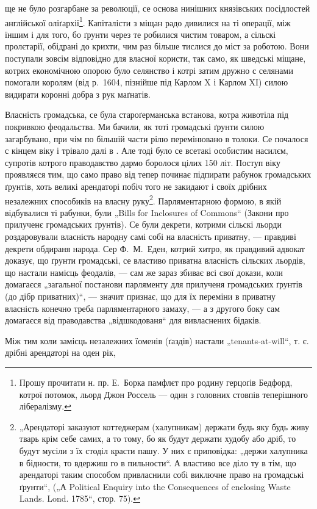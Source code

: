 \parcont{}
ще не було розгарбане за революції, се основа нинішних
князівських посідлостей англійської оліґархії\footnote{
Прошу прочитати н. пр. Е.~Борка памфлєт про родину герцоґів
Бедфорд, котрої потомок, льорд Джон Россель — один з головних стовпів
теперішного лібералізму.
}. Капіталісти
з міщан радо дивилися на ті операції, між їншим і для
того, бо ґрунти через те робилися чистим товаром, а сільскі
пролєтарії, обідрані до крихти, чим раз більше тислися
до міст за роботою. Вони поступали зовсім відповідно для
власної користи, так само, як шведські міщане, котрих економічною
опорою було селянство і котрі затим дружно с селянами
помогали королям (від р.~1604, пізнійше під Карлом
X і Карлом XI) силою видирати коронні добра з рук
маґнатів.

Власність громадська, се була староґерманська встанова,
котра животіла під покривкою феодальства. Ми бачили,
як тоті громадські ґрунти силою загарбувано, при
чім по більшій части рілю перемінювано в толоки. Се почалося
с кінцем  віку і трівало далі в . Але тоді було
се всетакі особистим насилєм, супротів котрого праводавство
дармо боролося цілих 150 літ. Поступ  віку проявляєся
тим, що само право від тепер починає підпирати рабунок
громадських ґрунтів, хоть великі арендаторі побіч
того не закидают і своїх дрібних незалежних способиків на
власну руку\footnote{
„Арендаторі заказуют коттеджерам (халупникам) держати будь
яку будь живу тварь крім себе самих, а то тому, бо як будут держати
худобу або дріб, то будут мусіли з їх стоділ красти пашу. У них є приповідка:
„держи халупника в бідности, то вдержиш го в пильности“.
А властиво все діло ту в тім, що арендаторі таким способом привласнили
собі виключне право на громадські ґрунти“, („А Political Enquiry into
the Consequences of enclosing Waste Lands. Lond. 1785“, стор. 75).
}.  Парляментарною формою, в якій відбувалися
ті рабунки, були „Bills for Inclosures of Commons“ (Закони
про прилученє громадських ґрунтів). Се були декрети, котрими
сільскі льорди роздаровували власність народну самі
собі на власність приватну, — правдиві декрети обдираня
народа. Сер Ф.~М.~Еден, котрий хитро, як правдивий адвокат
доказує, що ґрунти громадські, се властиво приватна
власність сільских льордів, що настали намісць феодалів,
— сам же зараз збиває всі свої докази, коли домагаєся
„загальної постанови парляменту для прилученя громадських
ґрунтів (до дібр приватних)“, — значит признає, що
для їх переміни в приватну власність конечно треба парляментарного
замаху, — а з другого боку сам домагаєся
від праводавства „відшкодованя“ для вивласнених бідаків.

Між тим коли замісць незалежних їоменів (ґаздів) настали
„tenants-at-will“, т. є. дрібні арендаторі на оден рік,
\parbreak{}
